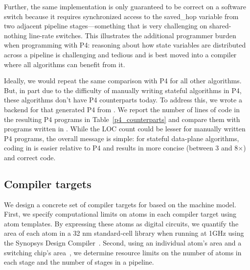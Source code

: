 Further, the same implementation is only guaranteed to be correct on a software
switch because it requires synchronized access to the saved\_hop variable from
two adjacent pipeline stages---something that is very challenging on
shared-nothing line-rate switches. This illustrates the additional programmer
burden when programming with P4: reasoning about how state variables are
distributed across a pipeline is challenging and tedious and is best moved into
a compiler where all algorithms can benefit from it.

Ideally, we would repeat the same comparison with P4 for all other algorithms.
But, in part due to the difficulty of manually writing stateful algorithms in
P4, these algorithms don't have P4 counterparts today. To address this, we
wrote a backend for \pktlanguage that generated P4 from \pktlanguage.  We
report the number of lines of code in the resulting P4 programs in
Table~\ref{p4_counterparts} and compare them with programs written in
\pktlanguage. While the LOC count could be lesser for manually written P4
programs, the overall message is simple: for stateful data-plane algorithms,
coding in \pktlanguage is easier relative to P4 and results in more concise
(between 3 and 8$\times$) and correct code.


\subsection{Compiler targets}
\label{ss:targets}

We design a concrete set of compiler targets for \pktlanguage based on the
\absmachine machine model. First, we specify computational limits on atoms in
each compiler target using atom templates. By expressing these atoms as digital
circuits, we quantify the area of each atom in a 32 nm standard-cell library
when running at 1GHz using the Synopsys Design Compiler~\cite{synopsys_dc}.
Second, using an individual atom's area and a switching chip's
area~\cite{gibb_parsing}, we determine resource limits on the number of atoms
in each stage and the number of stages in a pipeline.

